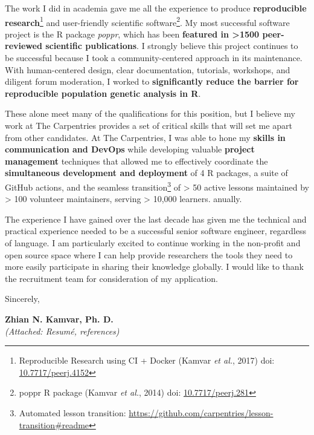 \vspace{2ex}

The work I did in academia gave me all the experience to produce 
\textbf{reproducible research}\footnote{Reproducible Research using CI + Docker (Kamvar \textit{et al.}, 2017) doi: \href{https://doi.org/10.7717/peerj.4152}{10.7717/peerj.4152}}
and user-friendly scientific software\footnote{poppr R package (Kamvar \textit{et al.}, 2014) doi: \href{https://doi.org/10.7717/peerj.281}{10.7717/peerj.281}}.
My most successful software project is the R package
\textit{poppr}, which has been \textbf{featured in \textgreater1500
peer-reviewed scientific publications}. I strongly believe this project
continues to be successful because I took a community-centered approach in its
maintenance. With human-centered design, clear documentation, tutorials,
workshops, and diligent forum moderation, I worked to \textbf{significantly
reduce the barrier for reproducible population genetic analysis in R}.

\vspace{2ex}

These alone meet many of the qualifications for this position, but I believe my
work at The Carpentries provides a set of critical skills that will set me
apart from other candidates. At The Carpentries, I was able to hone my
\textbf{skills in communication and DevOps} while developing valuable
\textbf{project management} techniques that allowed me to effectively
coordinate the \textbf{simultaneous development and deployment} of 4 R
packages, a suite of GitHub actions, and the seamless transition\footnote{Automated lesson transition: \url{https://github.com/carpentries/lesson-transition\#readme}}
of > 50 active lessons maintained by > 100 volunteer maintainers, serving >
10,000 learners. anually. 

\vspace{2ex}

The experience I have gained over the last decade has given me the technical and
practical experience needed to be a successful senior software engineer,
regardless of language. I am particularly excited to continue working in the 
non-profit and open source space where I can help provide researchers the tools
they need to more easily participate in sharing their knowledge globally. 
I would like to thank the recruitment team for consideration of my application.

\vspace{3ex}

Sincerely,

\vspace{4ex}

\textbf{Zhian N. Kamvar, Ph. D.}\\
{\footnotesize \textit{(Attached: Resum\'{e}, references)}}

\clearpage



